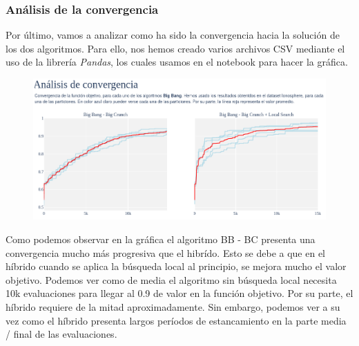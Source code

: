 \documentclass[10pt, a4paper]{article}
\theoremstyle{theorem-style}
\theoremstyle{theorem-style}
\theoremstyle{theorem2-style}
\theoremstyle{definition-style}
\theoremstyle{remark-style}
\theoremstyle{example-style}
\theoremstyle{definition-style}
\theoremstyle{remark-style}
\theoremstyle{remark-style}
\begin{document}
\subsubsection{Análisis de la convergencia}

Por último, vamos a analizar como ha sido la convergencia hacia la solución de los dos algoritmos. Para ello, nos hemos creado varios archivos CSV mediante el uso de la librería \textit{Pandas}, los cuales usamos en el notebook para hacer la gráfica. 

\begin{figure}[htp]
\centering
\includegraphics[scale=0.4750]{Imagenes/convergencia.png}
\label{}
\end{figure}

Como podemos observar en la gráfica el algoritmo BB - BC presenta una convergencia mucho más progresiva que el hibrído. Esto se debe a que en el híbrido cuando se aplica la búsqueda local al principio, se mejora mucho el valor objetivo. Podemos ver como de media el algoritmo sin búsqueda local necesita 10k evaluaciones para llegar al 0.9 de valor en la función objetivo. Por su parte, el híbrido requiere de la mitad aproximadamente. Sin embargo, podemos ver a su vez como el híbrido presenta largos períodos de estancamiento en la parte media / final de las evaluaciones. 
\end{document}

